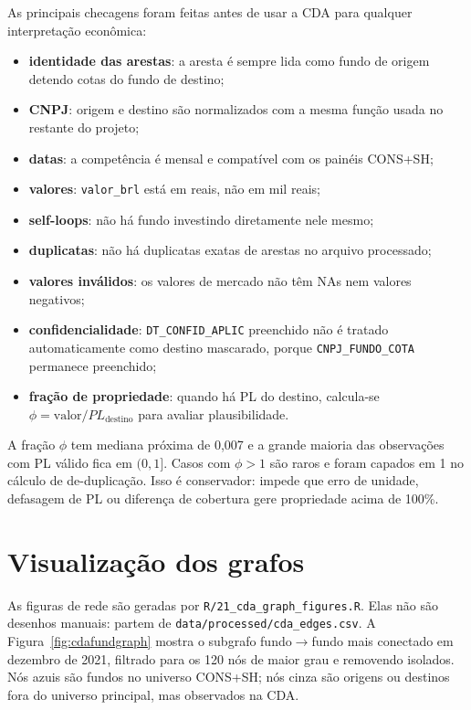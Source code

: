 \documentclass[12pt,a4paper]{report}
\begin{document}
As principais checagens foram feitas antes de usar a CDA para qualquer interpretação econômica:
\begin{itemize}
\item \textbf{identidade das arestas}: a aresta é sempre lida como fundo de origem detendo cotas do fundo de
destino;
\item \textbf{CNPJ}: origem e destino são normalizados com a mesma função usada no restante do projeto;
\item \textbf{datas}: a competência é mensal e compatível com os painéis CONS+SH;
\item \textbf{valores}: \texttt{valor\_brl} está em reais, não em mil reais;
\item \textbf{self-loops}: não há fundo investindo diretamente nele mesmo;
\item \textbf{duplicatas}: não há duplicatas exatas de arestas no arquivo processado;
\item \textbf{valores inválidos}: os valores de mercado não têm NAs nem valores negativos;
\item \textbf{confidencialidade}: \texttt{DT\_CONFID\_APLIC} preenchido não é tratado automaticamente como
destino mascarado, porque \texttt{CNPJ\_FUNDO\_COTA} permanece preenchido;
\item \textbf{fração de propriedade}: quando há PL do destino, calcula-se
$\phi=\text{valor}/PL_{\text{destino}}$ para avaliar plausibilidade.
\end{itemize}

A fração $\phi$ tem mediana próxima de 0,007 e a grande maioria das observações com PL válido fica em
$(0,1]$. Casos com $\phi>1$ são raros e foram capados em 1 no cálculo de de-duplicação. Isso é conservador:
impede que erro de unidade, defasagem de PL ou diferença de cobertura gere propriedade acima de 100\%.

\section{Visualização dos grafos}

As figuras de rede são geradas por \texttt{R/21\_cda\_graph\_figures.R}. Elas não são desenhos manuais:
partem de \texttt{data/processed/cda\_edges.csv}. A Figura~\ref{fig:cdafundgraph} mostra o subgrafo
fundo$\to$fundo mais conectado em dezembro de 2021, filtrado para os 120 nós de maior grau e removendo
isolados. Nós azuis são fundos no universo CONS+SH; nós cinza são origens ou destinos fora do universo
principal, mas observados na CDA.
\end{document}
